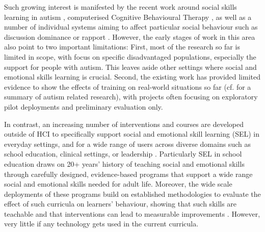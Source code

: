 \documentclass[prodmode,acmtochi]{acmsmall}
\begin{document}
Such growing interest is manifested by the recent work around social skills learning in autism \cite{Kientz2013}, computerised Cognitive Behavioural Therapy \cite{Coyle2007}, as well as a number of individual systems aiming to  affect particular social behaviour such as discussion dominance or rapport \cite{Balaam2011,Kim2008}. However, the early stages of work in this area also point to two important limitations: 
	First, most of the research so far is limited in scope, with focus on specific disadvantaged populations, especially the support for people with autism. This leaves aside other settings where social and emotional skills learning is crucial. 
	Second, the existing work has provided limited evidence to show the effects of training on real-world situations so far (cf. \cite[p. 108-109]{Kientz2013} for a summary of autism related research), with projects often focusing on exploratory pilot deployments and preliminary evaluation only. 

In contrast, an increasing number of interventions and courses are developed outside of HCI to specifically support social and emotional skill learning (SEL) in everyday settings, and for a wide range of users across diverse domains such as school education, clinical settings, or leadership \cite{Greenberg2010,Stepien2006,Barth2011,Carey2011,Bono2009}. Particularly SEL in school education draws on 20+ years' history of teaching social and emotional skills through carefully designed, evidence-based programs that support a wide range social and emotional skills needed for adult life. Moreover, the wide scale deployments of these programs build on established methodologies to evaluate the effect of such curricula on learners' behaviour, showing that such skills are teachable and that interventions can lead to measurable improvements \cite{Durlak2011,Weare2011}. However, very little if any technology gets used in the current curricula. 
\end{document}

